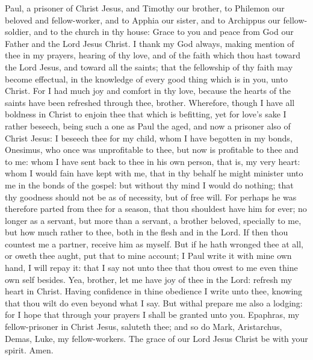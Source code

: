 


Paul, a prisoner of Christ Jesus, and Timothy our brother, to Philemon our beloved and fellow-worker, and to Apphia our sister, and to Archippus our fellow-soldier, and to the church in thy house: Grace to you and peace from God our Father and the Lord Jesus Christ.  I thank my God always, making mention of thee in my prayers, hearing of thy love, and of the faith which thou hast toward the Lord Jesus, and toward all the saints; that the fellowship of thy faith may become effectual, in the knowledge of every good thing which is in you, unto Christ. For I had much joy and comfort in thy love, because the hearts of the saints have been refreshed through thee, brother.  Wherefore, though I have all boldness in Christ to enjoin thee that which is befitting, yet for love’s sake I rather beseech, being such a one as Paul the aged, and now a prisoner also of Christ Jesus: I beseech thee for my child, whom I have begotten in my bonds, Onesimus, who once was unprofitable to thee, but now is profitable to thee and to me: whom I have sent back to thee in his own person, that is, my very heart: whom I would fain have kept with me, that in thy behalf he might minister unto me in the bonds of the gospel: but without thy mind I would do nothing; that thy goodness should not be as of necessity, but of free will. For perhaps he was therefore parted from thee for a season, that thou shouldest have him for ever; no longer as a servant, but more than a servant, a brother beloved, specially to me, but how much rather to thee, both in the flesh and in the Lord. If then thou countest me a partner, receive him as myself. But if he hath wronged thee at all, or oweth thee aught, put that to mine account; I Paul write it with mine own hand, I will repay it: that I say not unto thee that thou owest to me even thine own self besides. Yea, brother, let me have joy of thee in the Lord: refresh my heart in Christ.  Having confidence in thine obedience I write unto thee, knowing that thou wilt do even beyond what I say. But withal prepare me also a lodging: for I hope that through your prayers I shall be granted unto you.  Epaphras, my fellow-prisoner in Christ Jesus, saluteth thee; and so do Mark, Aristarchus, Demas, Luke, my fellow-workers.  The grace of our Lord Jesus Christ be with your spirit. Amen. 